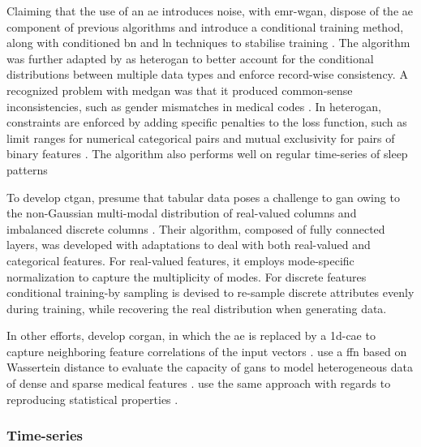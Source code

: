             Claiming that the use of an \gls{ae} introduces noise, with \gls{emr-wgan}, \citeauthor{Zhang2020} dispose of the \gls{ae} component of previous algorithms and introduce a conditional training method, along with conditioned \gls{bn} and \gls{ln} techniques to stabilise training \cite{Zhang2020}. The algorithm was further adapted by \citeauthor{yan2020generating} as \gls{heterogan} to better account for the conditional distributions between multiple data types and enforce record-wise consistency. A recognized problem with \gls{medgan} was that it produced common-sense inconsistencies, such as gender mismatches in medical codes \cite{yan2020generating, Choi2017-nt}. In \gls{heterogan}, constraints are enforced by adding specific penalties to the loss function, such as limit ranges for numerical categorical pairs and mutual exclusivity for pairs of binary features \cite{yan2020generating}. The algorithm also performs well on regular time-series of sleep patterns \cite{dash2019synthetic} \par

            To develop \gls{ctgan}, \citeauthor{Xu2019-ay} presume that tabular data poses a challenge to \gls{gan} owing to the non-Gaussian multi-modal distribution of real-valued columns and imbalanced discrete columns \cite{Xu2019-ay}. Their algorithm, composed of fully connected layers, was developed with adaptations to deal with both real-valued and categorical features. For real-valued features, it employs  mode-specific normalization  to capture the multiplicity of modes. For discrete features conditional  training-by sampling is devised to re-sample discrete attributes evenly during training, while recovering the real distribution when generating data.\par
            
            In other efforts, \citeauthor{torfi2019generating} develop \gls{corgan}, in which the \gls{ae} is replaced by a \gls{1d-cae} to capture neighboring feature correlations of the input vectors \cite{torfi2019generating}. \citeauthor{chincheong2020generation} use a \gls{ffn} based on Wassertein distance to evaluate the capacity of \glspl{gan} to model heterogeneous data of dense and sparse medical features \cite{chincheong2020generation}. \citeauthor{ozyigit2020generation} use the same approach with regards to reproducing statistical properties \cite{ozyigit2020generation}.
            
        \subsubsection{Time-series}
            
